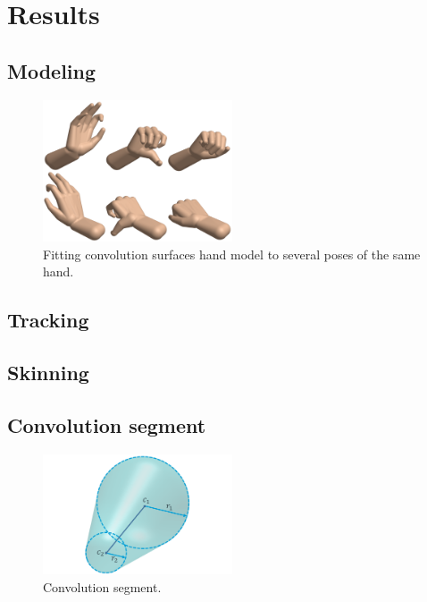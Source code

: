 \documentclass[10pt,journal,a4paper]{IEEEtran}
\begin{document}

\section{Results}

\subsection{Modeling}

\begin{figure}[h!] 
	\centering
	\includegraphics[width=0.5\textwidth]{figures/modeling}
	\caption{Fitting convolution surfaces hand model to several poses of the same hand.}
	\label{fig:modeling}
\end{figure}

\subsection{Tracking}

\subsection{Skinning}

\clearpage
\appendix
\subsection{Convolution segment}

\begin{figure}[h!] 
	\centering
	\includegraphics[width=0.5\textwidth]{figures/convsegment.png}
	\caption{Convolution segment.}
	\label{fig:convsegment}
\end{figure}
\end{document}
